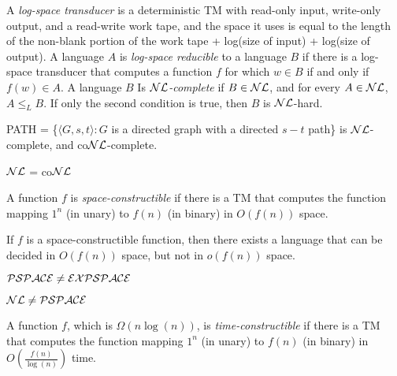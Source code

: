 \begin{definition}
A \emph{log-space transducer} is a deterministic TM with read-only input, write-only output, and a read-write work tape, and the space it uses is equal to the length of the non-blank portion of the work tape + log(size of input) + log(size of output). A language $A$ is \emph{log-space reducible} to a language $B$ if there is a log-space transducer that computes a function $f$ for which $w \in B$ if and only if $f(w) \in A$. A language $B$ Is \emph{$\mathcal{NL}$-complete} if $B \in \mathcal{NL}$, and for every $A \in \mathcal{NL}$, $A \le_L B$. If only the second condition is true, then $B$ is $\mathcal{NL}$-hard.
\end{definition}

\begin{theorem}
PATH = \{$\langle G, s, t\rangle : G$ is a directed graph with a directed $s-t$ path\} is $\mathcal{NL}$-complete, and co$\mathcal{NL}$-complete.
\end{theorem}

\begin{corollary}
$\mathcal{NL}$ = co$\mathcal{NL}$
\end{corollary}

\begin{definition}
A function $f$ is \emph{space-constructible} if there is a TM that computes the function mapping $1^n$ (in unary) to $f(n)$ (in binary) in $O(f(n))$ space.
\end{definition}

\begin{theorem}
If $f$ is a space-constructible function, then there exists a language that can be decided in $O(f(n))$ space, but not in $o(f(n))$ space.
\end{theorem}

\begin{corollary}
$\mathcal{PSPACE} \ne \mathcal{EXPSPACE}$
\end{corollary}

\begin{corollary}
$\mathcal{NL} \ne \mathcal{PSPACE}$
\end{corollary}

\begin{definition}
A function $f$, which is $\Omega(n\log(n))$, is \emph{time-constructible} if there is a TM that computes the function mapping $1^n$ (in unary) to $f(n)$ (in binary) in $O(\frac{f(n)}{\log(n)})$ time.
\end{definition}

